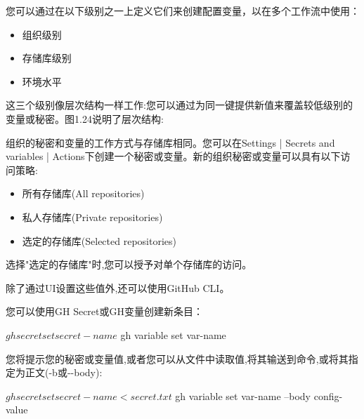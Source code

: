 
您可以通过在以下级别之一上定义它们来创建配置变量，以在多个工作流中使用：

\begin{itemize}
\item 
组织级别

\item 
存储库级别

\item 
环境水平
\end{itemize}

这三个级别像层次结构一样工作:您可以通过为同一键提供新值来覆盖较低级别的变量或秘密。图1.24说明了层次结构:


组织的秘密和变量的工作方式与存储库相同。您可以在Settings | Secrets and variables | Actions下创建一个秘密或变量。新的组织秘密或变量可以具有以下访问策略:

\begin{itemize}
\item 
所有存储库(All repositories)

\item 
私人存储库(Private repositories)

\item 
选定的存储库(Selected repositories)
\end{itemize}

选择"选定的存储库"时,您可以授予对单个存储库的访问。

除了通过UI设置这些值外,还可以使用GitHub CLI。

您可以使用GH Secret或GH变量创建新条目：

\begin{shell}
$ gh secret set secret-name
$ gh variable set var-name
\end{shell}

您将提示您的秘密或变量值,或者您可以从文件中读取值,将其输送到命令,或将其指定为正文(-b或-{}-body):

\begin{shell}
$ gh secret set secret-name < secret.txt
$ gh variable set var-name --body config-value
\end{shell}
